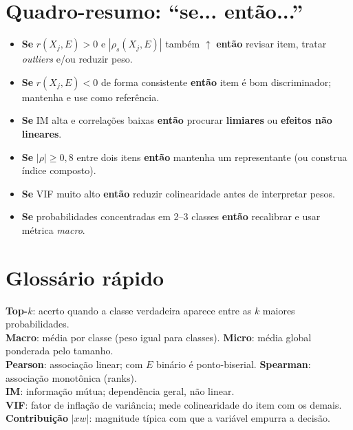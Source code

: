 \documentclass[12pt,a4paper]{article}
\begin{document}
\section{Quadro-resumo: ``se... então...''}
\begin{itemize}[leftmargin=1.2cm]
  \item \textbf{Se} $r(X_j,E)\!>\!0$ e $|\rho_s(X_j,E)|$ também $\uparrow$ \textbf{então} revisar item, tratar \emph{outliers} e/ou reduzir peso.
  \item \textbf{Se} $r(X_j,E)\!<\!0$ de forma consistente \textbf{então} item é bom discriminador; mantenha e use como referência.
  \item \textbf{Se} IM alta e correlações baixas \textbf{então} procurar \textbf{limiares} ou \textbf{efeitos não lineares}.
  \item \textbf{Se} $|\rho|\ge 0{,}8$ entre dois itens \textbf{então} mantenha um representante (ou construa índice composto).
  \item \textbf{Se} VIF muito alto \textbf{então} reduzir colinearidade antes de interpretar pesos.
  \item \textbf{Se} probabilidades concentradas em 2--3 classes \textbf{então} recalibrar e usar métrica \emph{macro}.
\end{itemize}

\section*{Glossário rápido}
\textbf{Top-$k$}: acerto quando a classe verdadeira aparece entre as $k$ maiores probabilidades.\\
\textbf{Macro}: média por classe (peso igual para classes). \textbf{Micro}: média global ponderada pelo tamanho.\\
\textbf{Pearson}: associação linear; com $E$ binário é ponto-biserial. \textbf{Spearman}: associação monotônica (ranks).\\
\textbf{IM}: informação mútua; dependência geral, não linear.\\
\textbf{VIF}: fator de inflação de variância; mede colinearidade do item com os demais.\\
\textbf{Contribuição} $|x w|$: magnitude típica com que a variável empurra a decisão.
\end{document}
